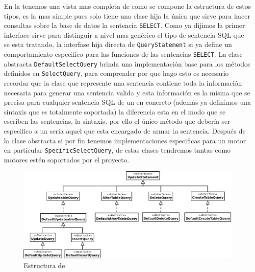 En la  tenemos una vista mas completa de como se compone la estructura de estos tipos, es la mas simple pues solo tiene una clase hija la única que sirve para hacer consultas sobre la base de datos la sentencia \verb=SELECT=. Como ya dijimos la primer interface sirve para distinguir a nivel mas genérico el tipo de sentencia SQL que se esta tratando, la interfase hija directa de \verb=QueryStatement= si ya define un comportamiento especifico para las funciones de las sentencias \verb=SELECT=. La clase abstracta \verb=DefaultSelectQuery= brinda una implementación base para los métodos definidos en \verb=SelectQuery=, para comprender por que hago esto es necesario recordar que la clase que represente una sentencia contiene toda la información necesaria para generar una sentencia valida y esta información es la misma que se precisa para cualquier sentencia SQL de un \dd en concreto (además ya definimos una sintaxis que es totalmente soportada) la diferencia esta en el modo que se escriben las sentencias, la sintaxis, por ello el único método que debería ser especifico a un \dd seria aquel que esta encargado de armar la sentencia. Después de la clase abstracta si por fin tenemos implementaciones especificas para un motor en particular \verb=SpecificSelectQuery=, de estas clases tendremos tantas como motores estén soportados por el proyecto.\\

\begin{figure}
  \centering
    \includegraphics[width=\textwidth]{figuras/crossdb-update.png}
  \caption{Estructura de}
  \label{fig:update}
\end{figure}


